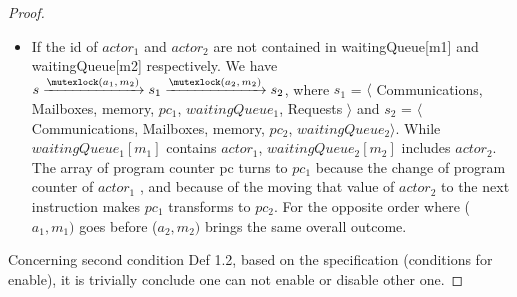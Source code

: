 \documentclass[a4paper,11pt]{article}
\theoremstyle{break}
\begin{document}
\begin{appendices}
\begin{proof}
\begin{itemize}
    
\item If the id of $actor_1$ and $actor_2$ are not contained in waitingQueue[m1] and waitingQueue[m2] respectively. We have  $s\xrightarrow{\mutexlock\text{($a_1, m_2$)}}s_1 \xrightarrow{\mutexlock\text{($a_2, m_2$)}}s_2$, where $s_1$ = $\langle$ Communications, Mailboxes, memory, $pc_1$, $waitingQueue_1$, Requests $\rangle$ and $s_2$ = $\langle$ Communications, Mailboxes, memory, $pc_2$, $waitingQueue_2$$\rangle$. While $waitingQueue_1[m_1]$ contains $actor_1$, $waitingQueue_2[m_2]$ includes $actor_2$. The array of program counter pc turns to $pc_1$ because the change of program counter of $actor_1$ , and because of the moving that value of $actor_2$ to the next instruction makes $pc_1$ transforms to $pc_2$. For the opposite order where \mutexlock($a_1, m_1)$ goes before \mutexlock($a_2, m_2)$ brings the same overall outcome. 
\end{itemize}
 
Concerning second condition Def 1.2, based on the specification (conditions for enable), it is trivially conclude one can not enable or disable other one. 
 \end{proof}
 
\end{appendices}
\end{document}
